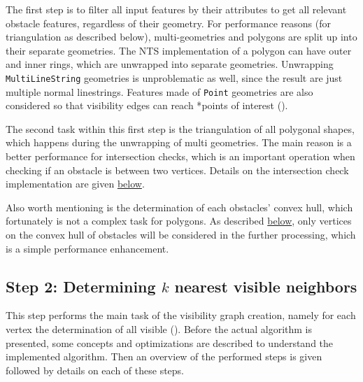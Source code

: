 		The first step is to filter all input features by their attributes to get all relevant obstacle features, regardless of their geometry.
		For performance reasons (for triangulation as described below), multi-geometries and polygons are split up into their separate geometries.
		The NTS implementation of a polygon can have outer and inner rings, which are unwrapped into separate geometries.
		Unwrapping \texttt{MultiLineString} geometries is unproblematic as well, since the result are just multiple normal linestrings.
		Features made of \texttt{Point} geometries are also considered so that visibility edges can reach *{points of interest} ().
		
		The second task within this first step is the triangulation of all polygonal shapes, which happens during the unwrapping of multi geometries.
		The main reason is a better performance for intersection checks, which is an important operation when checking if an obstacle is between two vertices.
		Details on the intersection check implementation are given \hyperref[subsubsec:intersection-checks]{below}.
		
		Also worth mentioning is the determination of each obstacles' convex hull, which fortunately is not a complex task for polygons.
		As described \hyperref[subsubsec:convex-hull]{below}, only vertices on the convex hull of obstacles will be considered in the further processing, which is a simple performance enhancement.
			
	\subsection{Step 2: Determining $k$ nearest visible neighbors}
	\label{subsec:step-2-knn-search}
			
		This step performs the main task of the visibility graph creation, namely for each vertex the determination of all visible  ().
		Before the actual algorithm is presented, some concepts and optimizations are described to understand the implemented algorithm.
		Then an overview of the performed steps is given followed by details on each of these steps.
		
